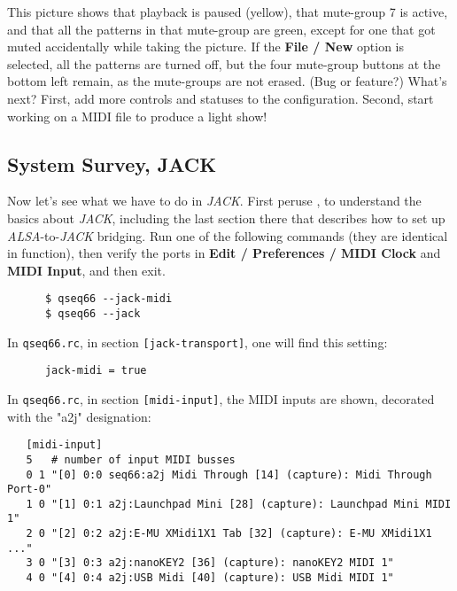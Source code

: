    This picture shows that playback is paused (yellow), that mute-group 7 is
   active, and that all the patterns in that mute-group are green, except for
   one that got muted accidentally while taking the picture.
   If the \textbf{File / New} option is selected, all the patterns are turned
   off, but the four mute-group buttons at the bottom left remain, as the
   mute-groups are not erased.  (Bug or feature?)
   What's next?  First, add more controls and statuses to the configuration.
   Second, start working on a MIDI file to produce a light show!

\subsection{System Survey, JACK}
\label{subsec:launchpad_mini_survey_jack}

   Now let's see what we have to do in \textsl{JACK}.
   First peruse , to understand the basics about
   \textsl{JACK}, including the last section there that describes how to set up
   \textsl{ALSA}-to-\textsl{JACK} bridging.
   Run one of the following commands (they are identical in function),
   then verify the ports in
   \textbf{Edit / Preferences / MIDI Clock} and \textbf{MIDI Input}, and then
   exit.

   \begin{verbatim}
      $ qseq66 --jack-midi
      $ qseq66 --jack
   \end{verbatim}

   In \texttt{qseq66.rc}, in section \texttt{[jack-transport]},
   one will find this setting:

   \begin{verbatim}
      jack-midi = true
   \end{verbatim}

   In \texttt{qseq66.rc}, in section \texttt{[midi-input]},
   the MIDI inputs are shown, decorated with the "a2j" designation:

   \begin{verbatim}
   [midi-input]
   5   # number of input MIDI busses
   0 1 "[0] 0:0 seq66:a2j Midi Through [14] (capture): Midi Through Port-0"
   1 0 "[1] 0:1 a2j:Launchpad Mini [28] (capture): Launchpad Mini MIDI 1"
   2 0 "[2] 0:2 a2j:E-MU XMidi1X1 Tab [32] (capture): E-MU XMidi1X1 ..."
   3 0 "[3] 0:3 a2j:nanoKEY2 [36] (capture): nanoKEY2 MIDI 1"
   4 0 "[4] 0:4 a2j:USB Midi [40] (capture): USB Midi MIDI 1"
   \end{verbatim}

